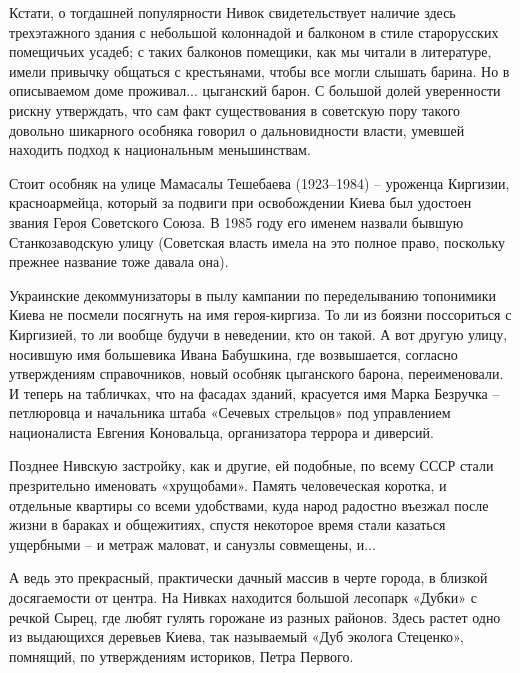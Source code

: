 
Кстати, о тогдашней популярности Нивок свидетельствует наличие здесь
трехэтажного здания с небольшой колоннадой и балконом в стиле старорусских
помещичьих усадеб; с таких балконов помещики, как мы читали в литературе, имели
привычку общаться с крестьянами, чтобы все могли слышать барина. Но в
описываемом доме проживал... цыганский барон. С большой долей уверенности рискну
утверждать, что сам факт существования в советскую пору такого довольно
шикарного особняка говорил о дальновидности власти, умевшей находить подход к
национальным меньшинствам.


Стоит особняк на улице Мамасалы Тешебаева (1923–1984) – уроженца Киргизии,
красноармейца, который за подвиги при освобождении  Киева был удостоен звания
Героя Советского Союза. В 1985 году его именем назвали бывшую Станкозаводскую
улицу (Советская власть имела на это полное право, поскольку прежнее название
тоже давала она).


Украинские декоммунизаторы в пылу кампании по переделыванию топонимики Киева не
посмели посягнуть на имя героя-киргиза. То ли из боязни поссориться с
Киргизией, то ли вообще будучи в неведении, кто он такой. А вот другую улицу,
носившую имя большевика Ивана Бабушкина,  где возвышается, согласно
утверждениям справочников, новый особняк цыганского барона,  переименовали. И
теперь на табличках, что на фасадах зданий, красуется имя Марка Безручка –
петлюровца и начальника штаба «Сечевых стрельцов» под управлением националиста
Евгения Коновальца, организатора террора и диверсий.

Позднее Нивскую застройку, как и другие, ей подобные, по всему СССР стали
презрительно именовать «хрущобами». Память человеческая коротка, и отдельные
квартиры со всеми удобствами, куда народ радостно въезжал после жизни в бараках
и общежитиях, спустя некоторое время стали казаться ущербными – и метраж
маловат, и санузлы совмещены, и...

А ведь это прекрасный, практически дачный массив в черте города, в близкой
досягаемости от центра. На Нивках находится большой лесопарк «Дубки» с речкой
Сырец, где любят гулять горожане из разных районов. Здесь растет одно из
выдающихся деревьев Киева, так называемый «Дуб эколога Стеценко», помнящий, по
утверждениям историков, Петра Первого.


